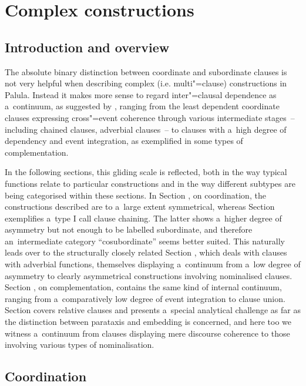 \chapter{Complex constructions}
\label{chap:13}

\section{Introduction and overview}
\label{sec:13-1}


The absolute binary distinction between coordinate and subordinate clauses is not very helpful when describing complex (i.e. multi"=clause) constructions in Palula. Instead it makes more sense to regard inter"=clausal dependence as a~continuum, as suggested by \citet[327--328]{givon2001b}, ranging from the least dependent coordinate clauses expressing cross"=event coherence through various intermediate stages~-- including chained clauses, adverbial clauses~-- to clauses with a~high degree of dependency and event integration, as exemplified in some types of complementation.



In the following sections, this gliding scale is reflected, both in the way typical functions relate to particular constructions and in the way different subtypes are being categorised within these sections. In Section , on coordination, the constructions described are to a~large extent symmetrical, whereas Section  exemplifies a~type I call clause chaining. The latter shows a~higher degree of asymmetry but not enough to be labelled subordinate, and therefore an~intermediate category ``cosubordinate'' seems better suited. This naturally leads over to the structurally closely related Section , which deals with clauses with adverbial functions, themselves displaying a~continuum from a~low degree of asymmetry to clearly asymmetrical constructions involving nominalised clauses. Section , on complementation, contains the same kind of internal continuum, ranging from a~comparatively low degree of event integration to clause union. Section  covers relative clauses and presents a~special analytical challenge as far as the distinction between parataxis and embedding is concerned, and here too we witness a~continuum from clauses displaying mere discourse coherence to those involving various types of nominalisation.


\section{Coordination}
\label{sec:13-2}

